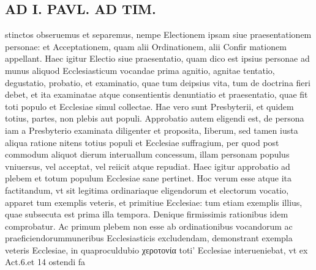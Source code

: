 \documentclass{article}
\begin{document}
\begin{pages}
\section*{AD I. PAVL. AD TIM. }\pstart stinctos obseruemus et separemus, nempe Electionem ipsam siue praesentationem personae: et Acceptationem, quam alii Ordinationem, alii Confir mationem appellant. Haec igitur Electio siue praesentatio, quam dico est ipsius personae ad munus aliquod Ecclesiasticum vocandae prima agnitio, agnitae tentatio, degustatio, probatio, et examinatio, quae tum deipsius vita, tum de doctrina fieri debet, et ita examinatae atque consentientis denuntiatio et praesentatio, quae fit toti populo et Ecclesiae simul collectae. Hae vero sunt Presbyterii, et quidem totius, partes, non plebis aut populi. Approbatio autem eligendi est, de persona iam a Presbyterio examinata diligenter et proposita, Iiberum, sed tamen iusta aliqua ratione nitens totius populi et Ecclesiae suffragium, per quod post commodum aliquot dierum interuallum concessum, illam personam populus vniuersus, vel acceptat, vel reiicit atque repudiat. Haec igitur approbatio ad plebem et totum populum Ecclesiae sane pertinet. Hoc verum esse atque ita factitandum, vt sit legitima ordinariaque eligendorum et electorum vocatio, apparet tum exemplis veteris, et primitiue Ecclesiae: tum etiam exemplis illius, quae subsecuta est prima illa tempora. Denique firmissimis rationibus idem comprobatur. Ac primum plebem non esse ab ordinationibus vocandorum ac praeficiendorummuneribus Ecclesiasticis excludendam, demonstrant exempla veteris Ecclesiae, in quaproculdubio χεροτονία toti' Ecclesiae interueniebat, vt ex Act.6.et 14 ostendi fa\pend

\end{pages}
\end{document}
